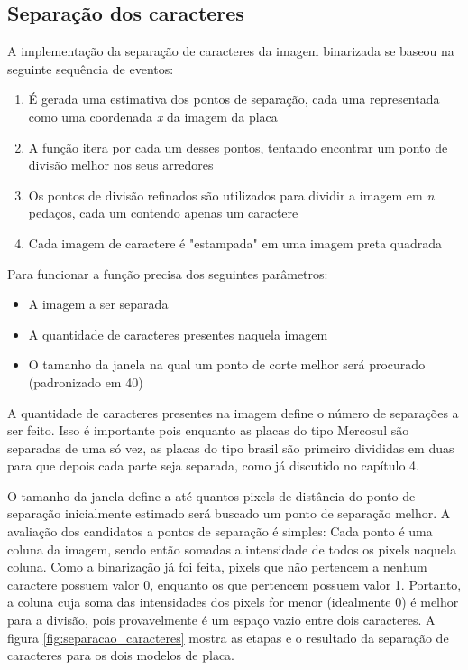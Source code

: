 \subsection{Separação dos caracteres}
A implementação da separação de caracteres da imagem binarizada se baseou na seguinte sequência de eventos:
\begin{enumerate} 
\item É gerada uma estimativa dos pontos de separação, cada uma representada como uma coordenada \textit{x} da imagem da placa 
\item A função itera por cada um desses pontos, tentando encontrar um ponto de divisão melhor nos seus arredores 
\item Os pontos de divisão refinados são utilizados para dividir a imagem em \textit{n} pedaços, cada um contendo apenas um caractere 
\item Cada imagem de caractere é "estampada" em uma imagem preta quadrada 
\end{enumerate}

Para funcionar a função precisa dos seguintes parâmetros:
\begin{itemize} 
\item A imagem a ser separada 
\item A quantidade de caracteres presentes naquela imagem 
\item O tamanho da janela na qual um ponto de corte melhor será procurado (padronizado em 40) 
\end{itemize}

A quantidade de caracteres presentes na imagem define o número de separações a ser feito. Isso é importante pois enquanto as placas do tipo Mercosul são separadas de uma só vez, as placas do tipo brasil são primeiro divididas em duas para que depois cada parte seja separada, como já discutido no capítulo 4.

O tamanho da janela define a até quantos pixels de distância do ponto de separação inicialmente estimado será buscado um ponto de separação melhor. A avaliação dos candidatos a pontos de separação é simples: Cada ponto é uma coluna da imagem, sendo então somadas a intensidade de todos os pixels naquela coluna. Como a binarização já foi feita, pixels que não pertencem a nenhum caractere possuem valor 0, enquanto os que pertencem possuem valor 1. Portanto, a coluna cuja soma das intensidades dos pixels for menor (idealmente 0) é melhor para a divisão, pois provavelmente é um espaço vazio entre dois caracteres. A figura \ref{fig:separacao_caracteres} mostra as etapas e o resultado da separação de caracteres para os dois modelos de placa.

